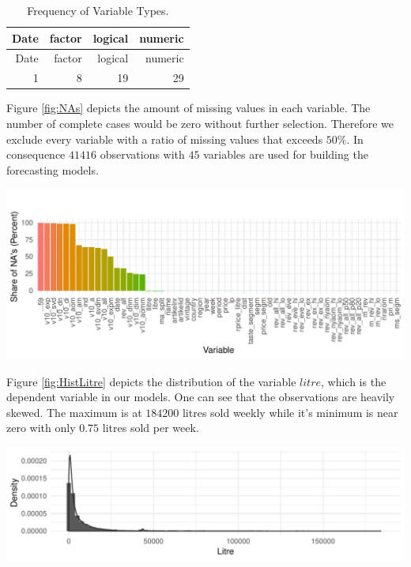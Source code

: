 \documentclass[11pt,]{article}
\let\origfigure\figure
\let\endorigfigure\endfigure
\renewenvironment{figure}[1][2] {
    \expandafter\origfigure\expandafter[H]
} {
    \endorigfigure
}
\begin{document}
\begin{longtable}[]{@{}rrrr@{}}
\caption{\label{tab:VarTyp}Frequency of Variable Types.}\tabularnewline
\toprule
Date & factor & logical & numeric\tabularnewline
\midrule
\endfirsthead
\toprule
Date & factor & logical & numeric\tabularnewline
\midrule
\endhead
1 & 8 & 19 & 29\tabularnewline
\bottomrule
\end{longtable}

Figure \ref{fig:NAs} depicts the amount of missing values in each
variable. The number of complete cases would be zero without further
selection. Therefore we exclude every variable with a ratio of missing
values that exceeds \(50\%\). In consequence \(41416\) observations with
\(45\) variables are used for building the forecasting models.

\begin{figure}
\centering
\includegraphics{../00_data/output_paper/02_missings_alt.pdf}
\caption{\label{fig:NAs}Share of Missing Values in the Wine Dataset.}
\end{figure}

Figure \ref{fig:HistLitre} depicts the distribution of the variable
\(litre\), which is the dependent variable in our models. One can see
that the observations are heavily skewed. The maximum is at \(184200\)
litres sold weekly while it's minimum is near zero with only \(0.75\)
litres sold per week.

\begin{figure}
\centering
\includegraphics{../00_data/output_paper/04_hist_litre.pdf}
\caption{\label{fig:HistLitre}Histogram and Estimated Density of the
Litre Variable.}
\end{figure}
\end{document}
